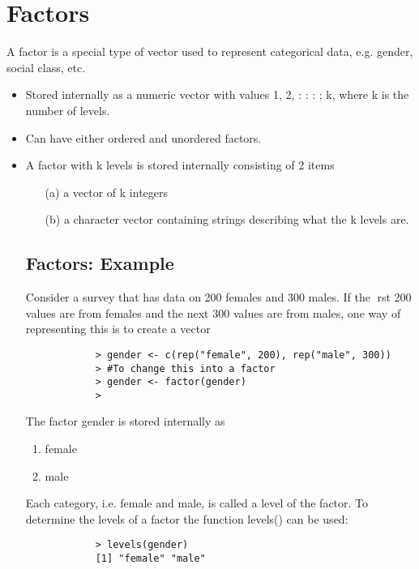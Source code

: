\section{Factors}
A factor is a special type of vector used to represent categorical
data, e.g. gender, social class, etc.
\begin{itemize}
	\item Stored internally as a numeric vector with values 1, 2, : : : ; k,
	where k is the number of levels.
	\item Can have either ordered and unordered factors.
	\item A factor with k levels is stored internally consisting of 2 items
	\begin{itemize}
		\item[(a)] a vector of k integers
		\item[(b)] a character vector containing strings describing what the k
		levels are.
	\end{itemize}
	
	
	\begin{frame}
		
		\subsection{Factors: Example}
		Consider a survey that has data on 200 females and 300 males. If
		the rst 200 values are from females and the next 300 values are
		from males, one way of representing this is to create a vector
		\begin{framed}
			\begin{verbatim}
			> gender <- c(rep("female", 200), rep("male", 300))
			> #To change this into a factor
			> gender <- factor(gender)
			>
			\end{verbatim}
		\end{framed}
		The factor gender is stored internally as
		\begin{enumerate}
	\item female
	\item male
		\end{enumerate}
	
		Each category, i.e. female and male, is called a level of the factor.
		To determine the levels of a factor the function levels() can be
		used:
		\begin{framed}
			\begin{verbatim}
			> levels(gender)
			[1] "female" "male"
			\end{verbatim}
		\end{framed}

\end{frame}
\end{itemize}
